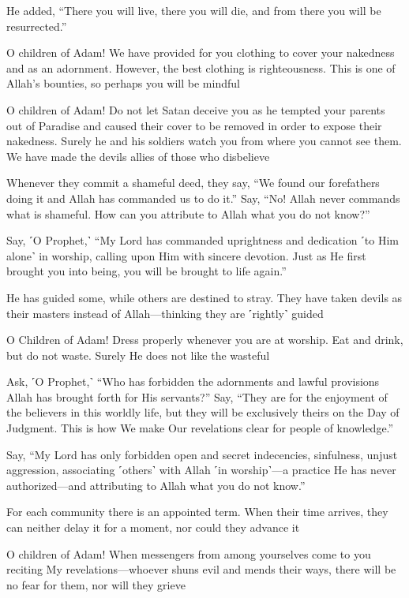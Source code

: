He added, “There you will live, there you will die, and from there you will be resurrected.”

O children of Adam! We have provided for you clothing to cover your nakedness and as an adornment. However, the best clothing is righteousness. This is one of Allah’s bounties, so perhaps you will be mindful

O children of Adam! Do not let Satan deceive you as he tempted your parents out of Paradise and caused their cover to be removed in order to expose their nakedness. Surely he and his soldiers watch you from where you cannot see them. We have made the devils allies of those who disbelieve

Whenever they commit a shameful deed, they say, “We found our forefathers doing it and Allah has commanded us to do it.” Say, “No! Allah never commands what is shameful. How can you attribute to Allah what you do not know?”

Say, ˹O Prophet,˺ “My Lord has commanded uprightness and dedication ˹to Him alone˺ in worship, calling upon Him with sincere devotion. Just as He first brought you into being, you will be brought to life again.”

He has guided some, while others are destined to stray. They have taken devils as their masters instead of Allah—thinking they are ˹rightly˺ guided

O Children of Adam! Dress properly whenever you are at worship. Eat and drink, but do not waste. Surely He does not like the wasteful

Ask, ˹O Prophet,˺ “Who has forbidden the adornments and lawful provisions Allah has brought forth for His servants?” Say, “They are for the enjoyment of the believers in this worldly life, but they will be exclusively theirs on the Day of Judgment. This is how We make Our revelations clear for people of knowledge.”

Say, “My Lord has only forbidden open and secret indecencies, sinfulness, unjust aggression, associating ˹others˺ with Allah ˹in worship˺—a practice He has never authorized—and attributing to Allah what you do not know.”

For each community there is an appointed term. When their time arrives, they can neither delay it for a moment, nor could they advance it

O children of Adam! When messengers from among yourselves come to you reciting My revelations—whoever shuns evil and mends their ways, there will be no fear for them, nor will they grieve

